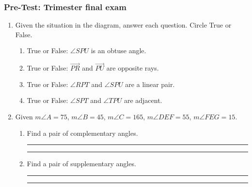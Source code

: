 \documentclass[12pt, oneside]{article}
\begin{document}
\subsubsection*{Pre-Test: Trimester final exam}
  \vspace{0.5cm}
  \begin{enumerate}

\subsubsection*{Angle pairs: apply theorems, solve using algebra}

  \item Given the situation in the diagram, answer each question. Circle True or False. %
      \begin{flushright}
      \end{flushright}
    \begin{enumerate}
      \item True or False: $\angle SPU$ is an obtuse angle.
      \item True or False: $\overrightarrow{PR}$ and $\overrightarrow{PU}$ are opposite rays.
      \item True or False: $\angle RPT$ and $\angle SPU$ are a linear pair.
      \item True or False: $\angle SPT$ and $\angle TPU$ are adjacent.
    \end{enumerate}

  \item Given $m \angle A=75$, $m \angle B=45$, $m \angle C=165$, $m \angle DEF=55$, $m \angle FEG=15$. \bigskip
    \begin{enumerate}
      \item Find a pair of complementary angles. \rule{3cm}{0.15mm} \hspace{1cm} \rule{3cm}{0.15mm} \bigskip
      \item Find a pair of supplementary angles. \rule{3cm}{0.15mm} \hspace{1cm} \rule{3cm}{0.15mm} \bigskip
    \end{enumerate}


\end{enumerate}
\end{document}
